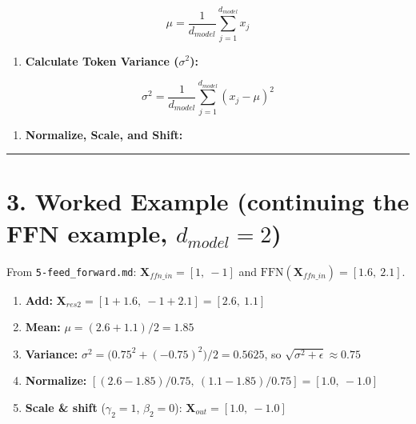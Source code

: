 \documentclass[11pt,a4paper,oneside]{report}
\providecommand{\tightlist}{\setlength{\itemsep}{0pt}\setlength{\parskip}{0pt}}
\begin{document}
\[\mu = \frac{1}{d_{model}} \sum_{j=1}^{d_{model}} x_j\]

\begin{enumerate}
\def\labelenumi{\arabic{enumi}.}
\setcounter{enumi}{1}
\tightlist
\item
  \textbf{Calculate Token Variance (\(\sigma^2\)):}
\end{enumerate}

\[\sigma^2 = \frac{1}{d_{model}} \sum_{j=1}^{d_{model}} (x_j - \mu)^2\]

\begin{enumerate}
\def\labelenumi{\arabic{enumi}.}
\setcounter{enumi}{2}
\tightlist
\item
  \textbf{Normalize, Scale, and Shift:}
\end{enumerate}

\begin{center}\end{center}

\begin{center}\rule{0.5\linewidth}{0.5pt}\end{center}

\section{\texorpdfstring{3. Worked Example (continuing the FFN example, \(d_{model} = 2\))}{3. Worked Example (continuing the FFN example, d\_\{model\} = 2)}}\label{3-worked-example-continuing-the-ffn-example-d_model--2}

From \texttt{5-feed\_\allowbreak{}forward.\allowbreak{}md}: \(\mathbf{X}_{ffn\_in} = [1,\ -1]\) and \(\text{FFN}(\mathbf{X}_{ffn\_in}) = [1.6,\ 2.1]\).

\begin{enumerate}
\def\labelenumi{\arabic{enumi}.}
\tightlist
\item
  \textbf{Add:} \(\mathbf{X}_{res2} = [1 + 1.6,\ -1 + 2.1] = [2.6,\ 1.1]\)
\item
  \textbf{Mean:} \(\mu = (2.6 + 1.1)/2 = 1.85\)
\item
  \textbf{Variance:} \(\sigma^2 = \big(0.75^2 + (-0.75)^2\big)/2 = 0.5625\), so \(\sqrt{\sigma^2 + \epsilon} \approx 0.75\)
\item
  \textbf{Normalize:} \([(2.6 - 1.85)/0.75,\ (1.1 - 1.85)/0.75] = [1.0,\ -1.0]\)
\item
  \textbf{Scale \& shift} (\(\gamma_2 = 1\), \(\beta_2 = 0\)): \(\mathbf{X}_{out} = [1.0,\ -1.0]\)
\end{enumerate}
\end{document}
